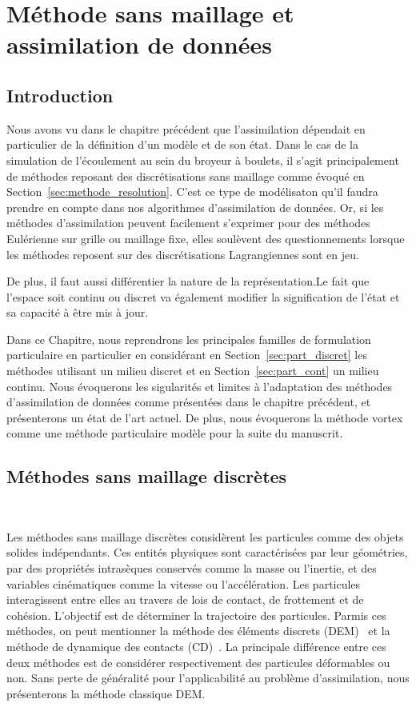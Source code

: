 
\chapter{Méthode sans maillage et assimilation de données}

\section{Introduction}

Nous avons vu dans le chapitre précédent que l'assimilation dépendait en particulier de la définition d'un modèle et de son état. Dans le cas de la simulation de l'écoulement au sein du broyeur à boulets, il s'agit principalement de méthodes reposant des discrétisations sans maillage comme évoqué en Section~\ref{sec:methode_resolution}. C'est ce type de modélisaton qu'il faudra prendre en compte dans nos algorithmes d'assimilation de données. Or, si les méthodes d'assimilation peuvent facilement s'exprimer pour des méthodes Eulérienne sur grille ou maillage fixe, elles soulèvent des questionnements lorsque les méthodes reposent sur des discrétisations Lagrangiennes sont en jeu.

De plus, il faut aussi différentier la nature de la représentation.Le fait que l'espace soit continu ou discret va également modifier la signification de l'état et sa capacité à être mis à jour.

Dans ce Chapitre, nous reprendrons les principales familles de formulation particulaire en particulier en considérant en Section~\ref{sec:part_discret} les méthodes utilisant un milieu discret et en Section~\ref{sec:part_cont} un milieu continu. Nous évoquerons les sigularités et limites à l'adaptation des méthodes d'assimilation de données comme présentées dans le chapitre précédent, et présenterons un état de l'art actuel. De plus, nous évoquerons la méthode vortex comme une méthode particulaire modèle pour la suite du manuscrit.

\section{Méthodes sans maillage discrètes}~\label{sec:part_discret}

Les méthodes sans maillage discrètes considèrent les particules comme des objets solides indépendants. Ces entités physiques sont caractérisées par leur géométries, par des propriétés intrasèques conservés comme la masse ou l'inertie, et des variables cinématiques comme la vitesse ou l'accélération. Les particules interagissent entre elles au travers de lois de contact, de frottement et de cohésion. L'objectif est de déterminer la trajectoire des particules. Parmis ces méthodes, on peut mentionner la méthode des éléments discrets (DEM)~\cite{radjai:hal-00691805} et la méthode de dynamique des contacts (CD)~\cite{moreau:hal-01824750}. La principale différence entre ces deux méthodes est de considérer respectivement des particules déformables ou non. Sans perte de généralité pour l'applicabilité au problème d'assimilation, nous présenterons la méthode classique DEM.


